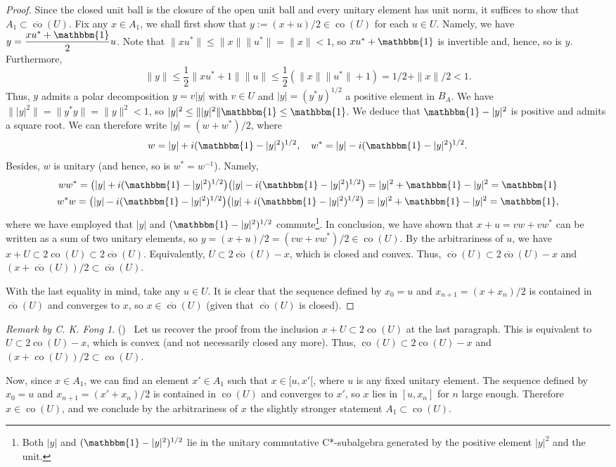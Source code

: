 \documentclass[12pt,english]{article}
\theoremstyle{definition}
\theoremstyle{remark}
\newtheorem*{remark*}{Remark by C. K. Fong}
\newcommand{\co}[1]{\operatorname{co}(#1)}
\newcommand{\cloco}[1]{\overline{\operatorname{co}}(#1)}
\begin{document}
\begin{proof}
	Since the closed unit ball is the closure of the open unit ball and every unitary element has unit norm, it suffices to show that $A_1\subset\cloco{U}$. Fix any $x\in A_1$, we shall first show that $y:=(x+u)/2\in\co{U}$ for each $u\in U$. Namely, we have $y=\dfrac{xu^*+\mathbbm{1}}{2}u$. Note that $\|xu^*\|\leq \|x\|\|u^*\|=\|x\|<1$, so $xu^*+\mathbbm{1}$ is invertible and, hence, so is $y$. Furthermore,\[\|y\|\leq \frac{1}{2} \|xu^*+1\|\|u\|\leq \frac{1}{2}(\|x\|\|u^*\|+1)=1/2+\|x\|/2<1.\]
	Thus, $y$ admits a polar decomposition $y=v|y|$ with $v\in U$ and $|y|=(y^*y)^{1/2}$ a positive element in $B_A$. We have
	$\||y|^2\|=\|y^*y\|=\|y\|^2<1$, so $|y|^2\leq \||y|^2\|\mathbbm{1}\leq \mathbbm{1}$. We deduce that $\mathbbm{1}-|y|^2$ is positive and admits a square root. We can therefore write $|y|=(w+w^*)/2$, where
	\[w=|y|+i(\mathbbm{1}-|y|^2)^{1/2},\quad w^*=|y|-i(\mathbbm{1}-|y|^2)^{1/2}.\]
	Besides, $w$ is unitary (and hence, so is $w^*=w^{-1}$). Namely, 
	\begin{gather*}
	ww^*=\big(|y|+i(\mathbbm{1}-|y|^2)^{1/2}\big)\big(|y|-i(\mathbbm{1}-|y|^2)^{1/2}\big)=|y|^2+\mathbbm{1}-|y|^2=\mathbbm{1}\\
	w^*w=\big(|y|-i(\mathbbm{1}-|y|^2)^{1/2}\big)\big(|y|+i(\mathbbm{1}-|y|^2)^{1/2}\big)=|y|^2+\mathbbm{1}-|y|^2=\mathbbm{1},
	\end{gather*}
	where we have employed that $|y|$ and $(\mathbbm{1}-|y|^2)^{1/2}$ commute\footnote{Both $|y|$ and $(\mathbbm{1}-|y|^2)^{1/2}$ lie in the unitary commutative C*-subalgebra generated by the positive element $|y|^2$ and the unit.}.
	In conclusion, we have shown that $x+u=vw+vw^*$ can be written as a sum of two unitary elements, so $y=(x+u)/2=(vw+vw^*)/2\in\co{U}$. By the arbitrariness of $u$, we have $x+U\subset 2\co{U}\subset 2\cloco{U}$. Equivalently, $U\subset 2\cloco{U}-x$, which is closed and convex. Thus, $\cloco{U}\subset 2\cloco{U}-x$ and $(x+\cloco{U})/2\subset \cloco{U}$.
	
	With the last equality in mind, take any $u\in U$. It is clear that the sequence defined by $x_0=u$ and $x_{n+1}=(x+x_n)/2$ is contained in $\cloco{U}$ and converges to $x$, so $x\in\cloco{U}$ (given that $\cloco{U}$ is closed).
\end{proof}

\begin{remark*} \label{rmk:gardner} {\normalfont (\cite[Note]{gardner})} \ Let us recover the proof from the inclusion $x+U\subset 2\co{U}$ at the last paragraph. This is equivalent to $U\subset 2\co{U}-x$, which is convex (and not necessarily closed any more). Thus, $\co{U}\subset 2\co{U}-x$ and $(x+\co{U})/2\subset \co{U}$.
	
Now, since $x\in A_1$, we can find an element $x'\in A_1$ such that $x\in[u,x'[$, where $u$ is any fixed unitary element. The sequence defined by $x_0=u$ and $x_{n+1}=(x'+x_n)/2$ is contained in $\co{U}$ and converges to $x'$, so $x$ lies in $[u,x_n]$ for $n$ large enough. Therefore $x\in \co{U}$, and we conclude by the arbitrariness of $x$ the slightly stronger statement $A_1\subset\co{U}$.
\end{remark*}
\end{document}
